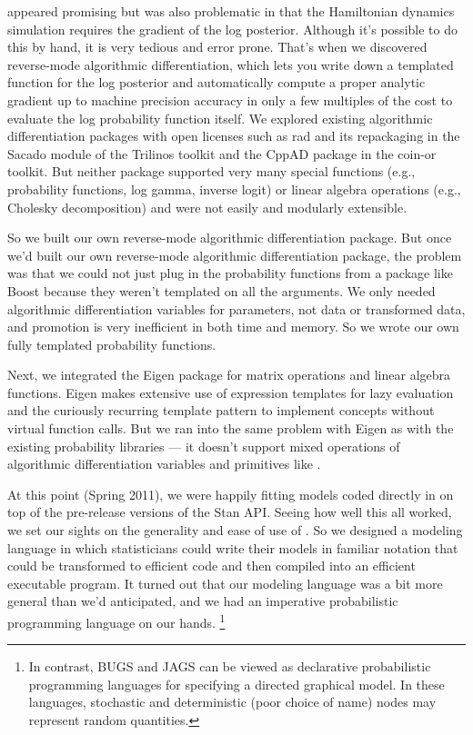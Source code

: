 \HMC appeared promising but was also problematic in that the
Hamiltonian dynamics simulation requires the gradient of the log
posterior.  Although it's possible to do this by hand, it is very
tedious and error prone.  That's when we discovered reverse-mode
algorithmic differentiation, which lets you write down a templated
\Cpp function for the log posterior and automatically compute a proper
analytic gradient up to machine precision accuracy in only a few
multiples of the cost to evaluate the log probability function itself.
We explored existing algorithmic differentiation packages with open
licenses such as {\sc rad} \citep{Gay:2005} and its repackaging in the
Sacado module of the Trilinos toolkit and the {\small CppAD} package in the
{\sc coin-or} toolkit.  But neither package supported very many
special functions (e.g., probability functions, log gamma, inverse logit) or
linear algebra operations (e.g., Cholesky decomposition) and were not
easily and modularly extensible.

So we built our own reverse-mode algorithmic differentiation package.
But once we'd built our own reverse-mode algorithmic differentiation
package, the problem was that we could not just plug in the
probability functions from a package like Boost because they weren't
templated on all the arguments.  We only needed algorithmic
differentiation variables for parameters, not data or transformed
data, and promotion is very inefficient in both time and memory.  So
we wrote our own fully templated probability functions.

Next, we integrated the Eigen \Cpp package for matrix operations and
linear algebra functions.  Eigen makes extensive use of expression
templates for lazy evaluation and the curiously recurring template
pattern to implement concepts without virtual function calls.  But we
ran into the same problem with Eigen as with the existing probability
libraries --- it doesn't support mixed operations of algorithmic
differentiation variables and primitives like .

At this point (Spring 2011), we were happily fitting models coded
directly in \Cpp on top of the pre-release versions of the Stan API.
Seeing how well this all worked, we set our sights on the generality
and ease of use of \BUGS.  So we designed a modeling language in which
statisticians could write their models in familiar notation that could
be transformed to efficient \Cpp code and then compiled into an
efficient executable program.  It turned out that our modeling
language was a bit more general than we'd anticipated, and we had an
imperative probabilistic programming language on our hands.%
%
\footnote{In contrast, BUGS and JAGS can be viewed as declarative
  probabilistic programming languages for specifying a directed
  graphical model.  In these languages, stochastic and deterministic
  (poor choice of name) nodes may represent random quantities.}

